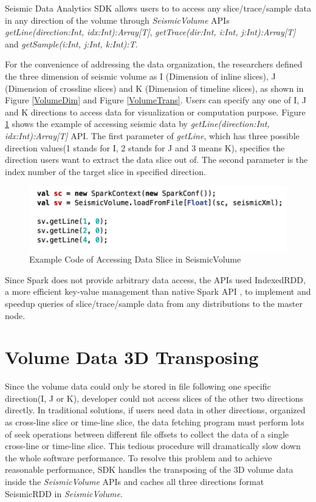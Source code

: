 Seismic Data Analytics SDK allows users to to access any slice/trace/sample data in any direction of the volume through \emph{SeismicVolume} APIs \emph{getLine(direction:Int, idx:Int):Array[T]}, \emph{getTrace(dir:Int, i:Int, j:Int):Array[T]} and \emph{getSample(i:Int, j:Int, k:Int):T}. 

For the convenience of addressing the data organization, the researchers defined the three dimension of seismic volume as I (Dimension of inline slices), J (Dimension of crossline slices) and K (Dimension of timeline slices), as shown in Figure \ref{VolumeDim} and Figure \ref{VolumeTrans}. Users can specify any one of I, J and K directions to access data for visualization or computation purpose.  Figure \ref{code_load_access} shows the example of accessing seismic data by \emph{getLine(direction:Int, idx:Int):Array[T]} API. The first parameter of \emph{getLine}, which has three possible direction values(1 stands for I, 2 stands for J and 3 means K), specifies the direction users want to extract the data slice out of.  The second parameter is the index number of the target slice in specified direction.

\begin{figure}[h]
\centering
\includegraphics[scale=0.8]{figures/code_load_access.png}
\caption{Example Code of Accessing Data Slice in SeismicVolume}
\label{code_load_access}
\end{figure}


Since Spark does not provide arbitrary data access, the APIs used IndexedRDD, a more efficient key-value management than native Spark API \cite{IndexedRDD}, to implement and speedup queries of slice/trace/sample data from any distributions to the master node.


\section{Volume Data 3D Transposing}

Since the volume data could only be stored in file following one specific direction(I, J or K), developer could not access slices of the other two directions directly. In traditional solutions, if users need data in other directions, organized as cross-line slice or time-line slice, the data fetching program must perform lots of seek operations between different file offsets to collect the data of a single cross-line or time-line slice. This tedious procedure will dramatically slow down the whole software performance. To resolve this problem and to achieve reasonable performance, SDK handles the transposing of the 3D volume data inside the \emph{SeismicVolume} APIs and caches all three directions format SeismicRDD in \emph{SeismicVolume}.

